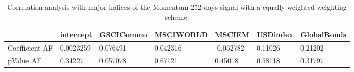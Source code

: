 \begin{table}[H]
\centering
\begin{tabular}{lllllll}
\hline& intercept & GSCICommo & MSCIWORLD & MSCIEM & USDindex & GlobalBonds \\ 
\hline 
Coefficient AF & 0.0023259 & 0.076491 & 0.042316 & -0.052782 & 0.11026 & 0.21202 \\ 
pValue AF & 0.34227 & 0.057078 & 0.67121 & 0.45018 & 0.58118 & 0.31797 \\ 
\hline
\end{tabular}
\caption{Correlation analysis with major indices of the Momentum 252 days signal with a equally weighted weighting scheme.}
\label{MOM252EW_AFACTOR}
\end{table}